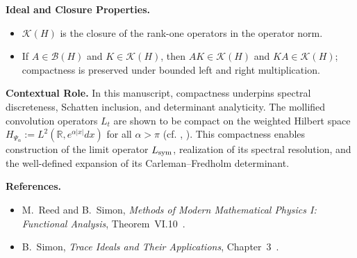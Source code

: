 \begin{definition}
\medskip
\noindent\textbf{Ideal and Closure Properties.}
\begin{itemize}
    \item \( \mathcal{K}(H) \) is the closure of the rank-one operators in the operator norm.
    \item If \( A \in \mathcal{B}(H) \) and \( K \in \mathcal{K}(H) \), then \( AK \in \mathcal{K}(H) \) and \( KA \in \mathcal{K}(H) \); compactness is preserved under bounded left and right multiplication.
\end{itemize}

\medskip
\noindent\textbf{Contextual Role.}
In this manuscript, compactness underpins spectral discreteness, Schatten inclusion, and determinant analyticity. The mollified convolution operators \( L_t \) are shown to be compact on the weighted Hilbert space \( H_{\Psi_\alpha} := L^2(\mathbb{R}, e^{\alpha|x|} dx) \) for all \( \alpha > \pi \) (cf. , ). This compactness enables construction of the limit operator \( L_{\mathrm{sym}} \), realization of its spectral resolution, and the well-defined expansion of its Carleman–Fredholm determinant.

\medskip
\noindent\textbf{References.}
\begin{itemize}
    \item M.~Reed and B.~Simon, \emph{Methods of Modern Mathematical Physics I: Functional Analysis}, Theorem~VI.10~\cite{ReedSimon1980I}.
    \item B.~Simon, \emph{Trace Ideals and Their Applications}, Chapter~3~\cite{Simon2005TraceIdeals}.
\end{itemize}
\end{definition}
